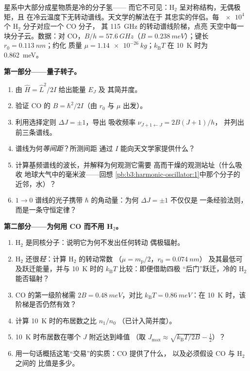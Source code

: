 \begin{problem}\label{pb:b3:quantum-angular-momentum:1}
星系中大部分成星物质是冷的分子氢——
而它不可见：H$_2$ 呈对称结构，无偶极矩，且
在冷云温度下无转动谱线。天文学的解法在于
其忠实的伴侣。每 $\num{e4}$ 个 H$_2$ 分子对应一个 CO 分子，
其 \qty{115}{GHz} 的转动谱线阶梯，点亮
天空中每一块分子云。数据：对 CO，$B/h = \qty{57.6}{GHz}$（$B =
\qty{0.238}{meV}$）；键长 $r_0 = \qty{0.113}{nm}$；约化
质量 $\mu = \qty{1.14e-26}{kg}$；$k_{\text{B}}T$ 在 \qty{10}{K} 时为
\qty{0.862}{meV}。

\medskip\noindent\textbf{第一部分——量子转子。}
\begin{enumerate}
  \item 由 $\hat H = \hat L^2/2I$ 给出能量 $E_J$ 及
        其简并度。
  \item 验证 CO 的 $B = \hbar^2/2I$（由 $r_0$ 与 $\mu$ 出发）。
  \item 利用选择定则 $\Delta J = \pm1$，导出
        吸收频率 $\nu_{J+1\leftarrow J} = 2B(J+1)/h$，
        并列出前三条谱线。
  \item 谱线为何\emph{等间距}？所测间距
        通过 $I$ 能向天文学家提供什么？
  \item 计算基频谱线的波长，并解释为何观测它需要
        高而干燥的观测站址（什么吸收
        地球大气中的毫米波——回想
        \cref{pb:b3:harmonic-oscillator:1}中那个分子的
        近邻，水）？
  \item $1 \to 0$ 谱线的光子携带
        $\hbar$ 的角动量：为何 $\Delta J = \pm1$ 不仅仅是
        一条经验法则，而是一条守恒定律？
\end{enumerate}

\medskip\noindent\textbf{第二部分——为何用 CO 而不用 H$_2$。}
\begin{enumerate}[resume]
  \item H$_2$ 是同核分子：说明它为何不发出任何转动
        偶极辐射。
  \item H$_2$ 还很\emph{轻}：计算 H$_2$ 的转动常数
        （$\mu = m_{\text{p}}/2$，$r_0 = \qty{0.074}{nm}$）
        及其最低可及跃迁能量，并与
        \qty{10}{K} 时的 $k_{\text{B}}T$ 比较：即便借助四极
        “后门”跃迁，冷的 H$_2$ 能否辐射？
  \item CO 的第一级阶梯需 $2B = \qty{0.48}{meV}$，对比
        $k_{\text{B}}T = \qty{0.86}{meV}$：在
        \qty{10}{K} 时，该阶梯是否仍然有效？
  \item 计算 \qty{10}{K} 时的布居数之比 $n_1/n_0$
        （已计入简并度）。
  \item \qty{10}{K} 时布居数在哪个 $J$ 附近达到峰值
        （取 $J_{\max} \approx \sqrt{k_{\text{B}}T/2B} - \tfrac12$）？
  \item 用一句话概括这笔“交易”的实质：CO 提供了什么，
        以及必须假设 CO 与 H$_2$ 之间的
        比值是多少。
\end{enumerate}


\end{problem}
